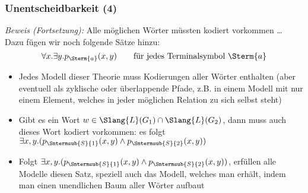 \documentclass[aspectratio=1610,onlymath]{beamer}
\begin{document}
\begin{frame}\frametitle{Unentscheidbarkeit (4)}


\emph{Beweis (Fortsetzung):} Alle möglichen Wörter müssten kodiert vorkommen \ldots{}
Dazu fügen wir noch folgende Sätze hinzu:
\[ \forall x.\exists y.p_{\Sterm{a}}(x,y) \qquad \text{für jedes Terminalsymbol $\Sterm{a}$}\]\pause\vspace{-7mm}

\begin{itemize}
\item Jedes Modell dieser Theorie muss Kodierungen aller Wörter enthalten (aber eventuell als zyklische oder überlappende Pfade, z.B. in einem Modell mit nur einem Element, welches in jeder möglichen Relation zu sich selbst steht)\pause
\item Gibt es ein Wort $w\in\Slang{L}(G_1)\cap\Slang{L}(G_2)$, dann muss auch dieses Wort kodiert vorkommen: es folgt $ \exists x,y. (p_{\Sntermsub{S}{1}}(x,y)\wedge p_{\Sntermsub{S}{2}}(x,y))$\pause
\item Folgt $\exists x,y. (p_{\Sntermsub{S}{1}}(x,y)\wedge p_{\Sntermsub{S}{2}}(x,y))$, erfüllen alle Modelle diesen Satz, speziell auch das Modell, welches man erhält, indem man einen unendlichen Baum aller Wörter aufbaut
\end{itemize}


\end{frame}
\end{document}
